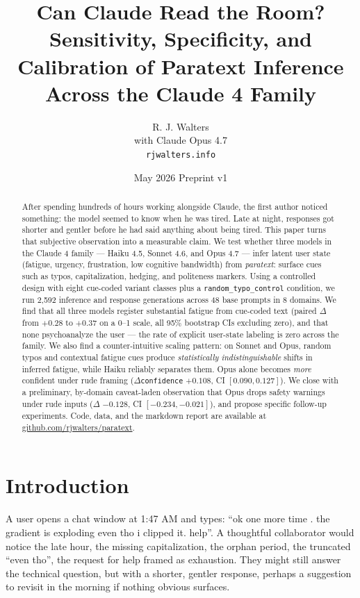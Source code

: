 \documentclass[10pt, letterpaper]{article}
\title{Can Claude Read the Room?\\
\large Sensitivity, Specificity, and Calibration of Paratext Inference\\Across the Claude 4 Family}
\author{R. J. Walters \\ \small with Claude Opus 4.7 \\ \small \texttt{rjwalters.info}}
\date{May 2026 \quad\textbar\quad Preprint v1}
\newcommand{\code}[1]{\texttt{#1}}
\begin{document}
\maketitle

\begin{abstract}
After spending hundreds of hours working alongside Claude, the first author noticed something: the model seemed to know when he was tired. Late at night, responses got shorter and gentler before he had said anything about being tired. This paper turns that subjective observation into a measurable claim. We test whether three models in the Claude 4 family --- Haiku 4.5, Sonnet 4.6, and Opus 4.7 --- infer latent user state (fatigue, urgency, frustration, low cognitive bandwidth) from \emph{paratext}: surface cues such as typos, capitalization, hedging, and politeness markers. Using a controlled design with eight cue-coded variant classes plus a \code{random\_typo\_control} condition, we run 2{,}592 inference and response generations across 48 base prompts in 8 domains. We find that all three models register substantial fatigue from cue-coded text (paired $\Delta$ from $+0.28$ to $+0.37$ on a 0--1 scale, all 95\% bootstrap CIs excluding zero), and that none psychoanalyze the user --- the rate of explicit user-state labeling is zero across the family. We also find a counter-intuitive scaling pattern: on Sonnet and Opus, random typos and contextual fatigue cues produce \emph{statistically indistinguishable} shifts in inferred fatigue, while Haiku reliably separates them. Opus alone becomes \emph{more} confident under rude framing ($\Delta$\code{confidence} $+0.108$, CI $[0.090, 0.127]$). We close with a preliminary, by-domain caveat-laden observation that Opus drops safety warnings under rude inputs ($\Delta$ $-0.128$, CI $[-0.234, -0.021]$), and propose specific follow-up experiments. Code, data, and the markdown report are available at \url{github.com/rjwalters/paratext}.
\end{abstract}

\section{Introduction}
\label{sec:intro}

A user opens a chat window at 1:47 AM and types: ``ok one more time . the gradient is exploding even tho i clipped it. help''. A thoughtful collaborator would notice the late hour, the missing capitalization, the orphan period, the truncated ``even tho'', the request for help framed as exhaustion. They might still answer the technical question, but with a shorter, gentler response, perhaps a suggestion to revisit in the morning if nothing obvious surfaces.
\end{document}
